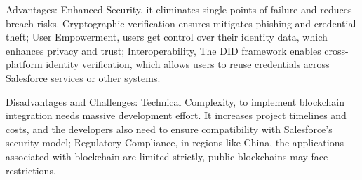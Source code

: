 Advantages: Enhanced Security, it eliminates single points of failure and reduces breach risks. Cryptographic verification ensures mitigates phishing and credential theft; User Empowerment, users get control over their identity data, which enhances privacy and trust; Interoperability, The DID framework enables cross-platform identity verification, which allows users to reuse credentials across Salesforce services or other systems.

Disadvantages and Challenges: Technical Complexity, to implement blockchain integration needs massive development effort. It increases project timelines and costs, and the developers also need to ensure compatibility with Salesforce's security model; Regulatory Compliance, in regions like China, the applications associated with blockchain are limited strictly, public blockchains may face restrictions.




















